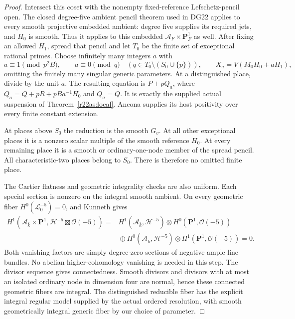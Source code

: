 \begin{proof}
Intersect this coset with the nonempty
fixed-reference Lefschetz-pencil open.  The
closed degree-five ambient pencil theorem used
in DG22 applies to every smooth projective
embedded ambient: degree five supplies its
required jets, and $H_0$ is smooth.  Thus it
applies to this embedded $\mathcal A_F\times
\mathbf P^1_F$ as well.  After fixing an allowed
$H_1$, spread that pencil and let $T_0$ be the
finite set of exceptional rational primes.
Choose infinitely many integers $a$ with
\[
 a\equiv1\pmod{p^2B},\qquad
 a\equiv0\pmod q
           \quad(q\in T_0\setminus(S_0\cup\{p\})),
 \qquad X_a=V(M_0H_0+aH_1),
 \tag{AS22.11}\label{r22as:Xa}
\]
omitting the finitely many singular generic
parameters.  At a distinguished place, divide
by the unit $a$.  The resulting equation is
$P+pQ_a$, where
$Q_a=Q+pR+pB a^{-1}H_0$ and
$\overline{Q_a}=\bar Q$.  It is exactly the
supplied actual suspension of
Theorem~\ref{r22as:local}.  Ancona supplies its
host positivity over every finite constant
extension.

At places above $S_0$ the reduction is the
smooth $G_v$.  At all other exceptional places
it is a nonzero scalar multiple of the
smooth reference $H_0$.  At every remaining
place it is a smooth or ordinary-one-node
member of the spread pencil.  All
characteristic-two places belong to $S_0$.
There is therefore no omitted finite place.

The Cartier flatness and geometric integrality
checks are also uniform.  Each special section
is nonzero on the integral smooth ambient.
On every geometric fiber
$H^0(\mathcal L_0^{-5})=0$, and Kunneth gives
\[
\begin{split}
 H^1(\mathcal A_{\bar k}\times\mathbf P^1,
                     \mathcal H^{-5}\boxtimes\mathcal O(-5))
  ={}&
 H^1(\mathcal A_{\bar k},\mathcal H^{-5})
                        \otimes H^0(\mathbf P^1,\mathcal O(-5))\\
 &{}\oplus
 H^0(\mathcal A_{\bar k},\mathcal H^{-5})
                        \otimes H^1(\mathbf P^1,\mathcal O(-5))
       =0.
\end{split}
 \tag{AS22.12}\label{r22as:connected}
\]
Both vanishing factors are simply degree-zero
sections of negative ample line bundles.  No
abelian higher-cohomology vanishing is needed
in this step.  The divisor sequence gives
connectedness.  Smooth divisors and divisors
with at most an isolated ordinary node in
dimension four are normal, hence these
connected geometric fibers are integral.
The distinguished reducible fiber has the
explicit integral regular model supplied by
the actual ordered resolution, with smooth
geometrically integral generic fiber by our
choice of parameter.


\end{proof}
